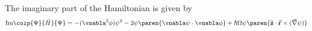 \documentclass[onecolumn,amsmath,amssymb,nofootinbib,floatfix]{revtex4}
\begin{document}
The imaginary part of the Hamiltonian is given by
$$\text{Im}\coip{\Psi}{\hat H}{\Psi} = -(\vnabla^2\phi)\psi^2 -2\psi\paren{\vnabla\psi\cdot\vnabla\phi}+\hbar\Omega\psi\paren{\hat{\textbf{z}}\cdot\vec{\textbf{r}}\times(\vec{\nabla}\psi)}$$
\end{document}
